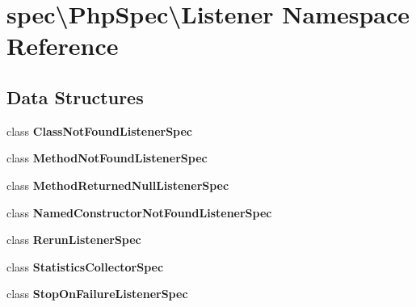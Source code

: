\section{spec\textbackslash{}Php\+Spec\textbackslash{}Listener Namespace Reference}
\label{namespacespec_1_1_php_spec_1_1_listener}
\subsection*{Data Structures}
\begin{DoxyCompactItemize}
\item 
class {\bf Class\+Not\+Found\+Listener\+Spec}
\item 
class {\bf Method\+Not\+Found\+Listener\+Spec}
\item 
class {\bf Method\+Returned\+Null\+Listener\+Spec}
\item 
class {\bf Named\+Constructor\+Not\+Found\+Listener\+Spec}
\item 
class {\bf Rerun\+Listener\+Spec}
\item 
class {\bf Statistics\+Collector\+Spec}
\item 
class {\bf Stop\+On\+Failure\+Listener\+Spec}
\end{DoxyCompactItemize}
